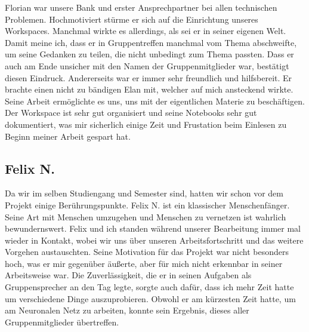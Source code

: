 \documentclass{article}
\begin{document}
Florian war unsere Bank und erster Ansprechpartner bei allen technischen Problemen. Hochmotiviert stürme er sich auf die Einrichtung unseres Workspaces.
Manchmal wirkte es allerdings, als sei er in seiner eigenen Welt. Damit meine ich, dass er in Gruppentreffen manchmal vom Thema abschweifte,
um seine Gedanken zu teilen, die nicht unbedingt zum Thema passten. Dass er auch am Ende unsicher mit den Namen der Gruppenmitglieder 
war, bestätigt diesen Eindruck. Andererseits war er immer sehr freundlich und hilfsbereit. Er brachte einen nicht zu bändigen Elan 
mit, welcher auf mich ansteckend wirkte. Seine Arbeit ermöglichte es uns, uns mit der eigentlichen Materie zu beschäftigen. Der Workspace 
ist sehr gut organisiert und seine Notebooks sehr gut dokumentiert, was mir sicherlich einige Zeit und Frustation beim Einlesen zu Beginn meiner Arbeit gespart hat.

\subsection{Felix N.}

Da wir im selben Studiengang und Semester sind, hatten wir schon vor dem Projekt einige Berührungspunkte.
Felix N. ist ein klassischer Menschenfänger. Seine Art mit Menschen umzugehen und Menschen zu vernetzen ist wahrlich bewundernswert. 
Felix und ich standen während unserer Bearbeitung immer mal wieder in Kontakt, wobei wir uns über unseren Arbeitsfortschritt und das weitere Vorgehen austauschten.
Seine Motivation für das Projekt war nicht besonders hoch, was er mir gegenüber äußerte, aber für mich nicht erkennbar in seiner Arbeitsweise war.
Die Zuverlässigkeit, die er in seinen Aufgaben als Gruppensprecher an den Tag legte, sorgte auch dafür, dass ich mehr Zeit hatte um verschiedene Dinge auszuprobieren.
Obwohl er am kürzesten Zeit hatte, um am Neuronalen Netz zu arbeiten, konnte sein Ergebnis, dieses aller Gruppenmitglieder übertreffen. 
\end{document}
